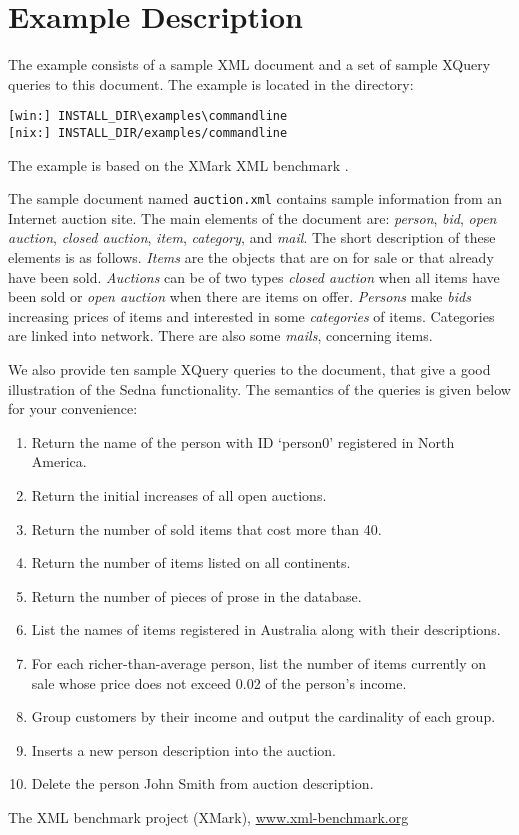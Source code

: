 \documentclass[a4paper,12pt]{article}
\begin{document}
\section{Example Description}
\label{sec:example-description}

The example consists of a sample XML document and a set of sample XQuery queries
to this document. The example is located in the directory:
\begin{verbatim}
[win:] INSTALL_DIR\examples\commandline
[nix:] INSTALL_DIR/examples/commandline
\end{verbatim}
The example is based on the XMark XML benchmark \cite{xmark}.

The sample document named \verb!auction.xml! contains sample information from an
Internet auction site. The main elements of the document are: \emph{person},
\emph{bid}, \emph{open auction}, \emph{closed auction}, \emph{item},
\emph{category}, and \emph{mail}. The short description of these elements is as
follows. \emph{Items} are the objects that are on for sale or that already have
been sold. \emph{Auctions} can be of two types \emph{closed auction} when all
items have been sold or \emph{open auction} when there are items on offer.
\emph{Persons} make \emph{bids} increasing prices of items and interested in
some \emph{categories} of items. Categories are linked into network. There are
also some \emph{mails}, concerning items. 

We also provide ten sample XQuery queries to the document, that give a good
illustration of the Sedna functionality. The semantics of the queries is given
below for your convenience:

\begin{enumerate}
\item Return the name of the person with ID `person0' registered in North
 America.
\item Return the initial increases of all open auctions.
\item Return the number of sold items that cost more than 40.
\item Return the number of items listed on all continents.
\item Return the number of pieces of prose in the database.
\item List the names of items registered in Australia along with their
 descriptions.
\item For each richer-than-average person, list the number of items currently
 on sale whose price does not exceed 0.02 of the person's income.
\item Group customers by their income and output the cardinality of each group.
\item Inserts a new person description into the auction.
\item Delete the person John Smith from auction description.
\end{enumerate}

\begin{thebibliography}{9}
 The XML benchmark project (XMark), \url{www.xml-benchmark.org}
\end{thebibliography}
\end{document}
